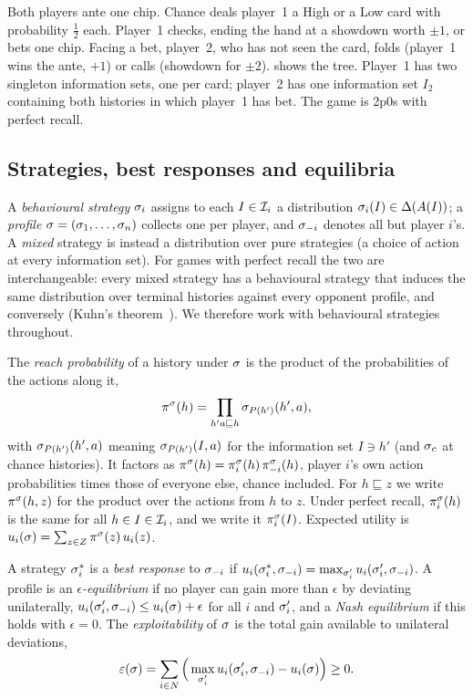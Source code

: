 \begin{example}\label{ex:bluff}
Both players ante one chip. Chance deals player~1 a High or a Low card with probability $\tfrac12$ each. Player~1
checks, ending the hand at a showdown worth $\pm1$, or bets one chip. Facing a bet, player~2, who has not seen the
card, folds (player~1 wins the ante, $+1$) or calls (showdown for $\pm2$).  shows the tree.
Player~1 has two singleton information sets, one per card; player~2 has one information set $I_2$ containing both
histories in which player~1 has bet. The game is 2p0s with perfect recall.
\end{example}

\subsection{Strategies, best responses and equilibria}\label{sec:equilibria}

A \emph{behavioural strategy} $\sigma_i$ assigns to each $I \in \mathcal{I}_i$ a distribution $\sigma_i(I) \in
\Delta(A(I))$; a \emph{profile} $\sigma = (\sigma_1,\dots,\sigma_n)$ collects one per player, and $\sigma_{-i}$
denotes all but player $i$'s. A \emph{mixed} strategy is instead a distribution over pure strategies (a choice of
action at every information set). For games with perfect recall the two are interchangeable: every mixed strategy has
a behavioural strategy that induces the same distribution over terminal histories against every opponent profile,
and conversely (Kuhn's theorem~\cite{kuhn1953}). We therefore work with behavioural strategies throughout.

The \emph{reach probability} of a history under $\sigma$ is the product of the probabilities of the actions along it,
\[
  \pi^\sigma(h) = \prod_{h'a \sqsubseteq h} \sigma_{P(h')}(h',a),
\]
with $\sigma_{P(h')}(h',a)$ meaning $\sigma_{P(h')}(I,a)$ for the information set $I \ni h'$ (and $\sigma_c$ at
chance histories). It factors as $\pi^\sigma(h) = \pi^\sigma_i(h)\,\pi^\sigma_{-i}(h)$, player $i$'s own
action probabilities times those of everyone else, chance included. For $h \sqsubseteq z$ we write
$\pi^\sigma(h,z)$ for the product over the actions from $h$ to $z$. Under perfect recall, $\pi^\sigma_i(h)$ is
the same for all $h \in I \in \mathcal{I}_i$, and we write it $\pi^\sigma_i(I)$. Expected utility is
$u_i(\sigma) = \sum_{z \in Z} \pi^\sigma(z)\,u_i(z)$.

\begin{definition}\label{def:equilibrium}
A strategy $\sigma_i^*$ is a \emph{best response} to $\sigma_{-i}$ if $u_i(\sigma_i^*,\sigma_{-i}) =
\max_{\sigma_i'} u_i(\sigma_i',\sigma_{-i})$. A profile is an \emph{$\epsilon$-equilibrium} if no player can gain more
than $\epsilon$ by deviating unilaterally, $u_i(\sigma_i',\sigma_{-i}) \le u_i(\sigma) + \epsilon$ for all $i$ and
$\sigma_i'$, and a \emph{Nash equilibrium} if this holds with $\epsilon = 0$. The \emph{exploitability} of $\sigma$
is the total gain available to unilateral deviations,
\[
  \varepsilon(\sigma) = \sum_{i \in N} \Big( \max_{\sigma_i'} u_i(\sigma_i',\sigma_{-i}) - u_i(\sigma) \Big) \ge 0.
\]
\end{definition}

